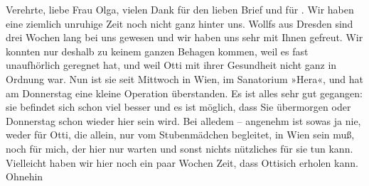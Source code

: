 \pstart{}Verehrte, liebe Frau Olga,\pend\vspace{0.5em}
\pstart
           vielen Dank für den lieben Brief und für \label{K_L03560-1v}\label{K_L03560-1}. Wir haben eine ziemlich unruhige Zeit
               noch nicht ganz hinter uns. Wollfs
               aus Dresden sind drei Wochen lang bei uns gewesen
               und wir haben uns sehr mit Ihnen gefreut. Wir konnten nur deshalb zu keinem ganzen
               Behagen kommen, weil es fast unaufhörlich geregnet hat, und weil Otti mit ihrer Gesundheit nicht ganz in Ordnung war. Nun ist
               sie seit Mittwoch in Wien, im Sanatorium »Hera«, und hat am
                  Donnerstag eine kleine Operation überstanden. Es
               ist alles sehr gut gegangen: sie befindet sich schon viel besser und es ist möglich,
               dass Sie übermorgen oder Donnerstag schon wieder hier sein wird. Bei alledem – angenehm ist sowas ja nie, weder für Otti, die allein, nur vom Stubenmädchen begleitet, in Wien sein muß, noch für mich, der hier nur warten
               und sonst nichts nützliches für sie tun kann. Vielleicht haben wir hier noch ein paar
               Wochen Zeit, dass Ottisich erholen kann. Ohnehin
